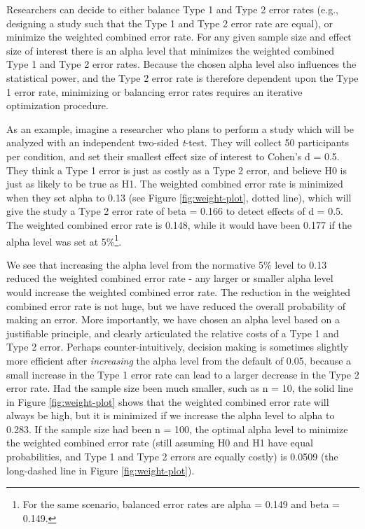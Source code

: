 \documentclass[
  english,
  ,man, a4paper,floatsintext]{apa6}
\begin{document}
Researchers can decide to either balance Type 1 and Type 2 error rates (e.g., designing a study such that the Type 1 and Type 2 error rate are equal), or minimize the weighted combined error rate. For any given sample size and effect size of interest there is an alpha level that minimizes the weighted combined Type 1 and Type 2 error rates. Because the chosen alpha level also influences the statistical power, and the Type 2 error rate is therefore dependent upon the Type 1 error rate, minimizing or balancing error rates requires an iterative optimization procedure.

As an example, imagine a researcher who plans to perform a study which will be analyzed with an independent two-sided \emph{t}-test. They will collect 50 participants per condition, and set their smallest effect size of interest to Cohen's d = 0.5. They think a Type 1 error is just as costly as a Type 2 error, and believe H0 is just as likely to be true as H1. The weighted combined error rate is minimized when they set alpha to 0.13 (see Figure \ref{fig:weight-plot}, dotted line), which will give the study a Type 2 error rate of beta = 0.166 to detect effects of d = 0.5. The weighted combined error rate is 0.148, while it would have been 0.177 if the alpha level was set at 5\%\footnote{For the same scenario, balanced error rates are alpha = 0.149 and beta = 0.149.}.

We see that increasing the alpha level from the normative 5\% level to 0.13 reduced the weighted combined error rate - any larger or smaller alpha level would increase the weighted combined error rate. The reduction in the weighted combined error rate is not huge, but we have reduced the overall probability of making an error. More importantly, we have chosen an alpha level based on a justifiable principle, and clearly articulated the relative costs of a Type 1 and Type 2 error. Perhaps counter-intuitively, decision making is sometimes slightly more efficient after \emph{increasing} the alpha level from the default of 0.05, because a small increase in the Type 1 error rate can lead to a larger decrease in the Type 2 error rate. Had the sample size been much smaller, such as n = 10, the solid line in Figure \ref{fig:weight-plot} shows that the weighted combined error rate will always be high, but it is minimized if we increase the alpha level to alpha to 0.283. If the sample size had been n = 100, the optimal alpha level to minimize the weighted combined error rate (still assuming H0 and H1 have equal probabilities, and Type 1 and Type 2 errors are equally costly) is 0.0509 (the long-dashed line in Figure \ref{fig:weight-plot}).
\end{document}
